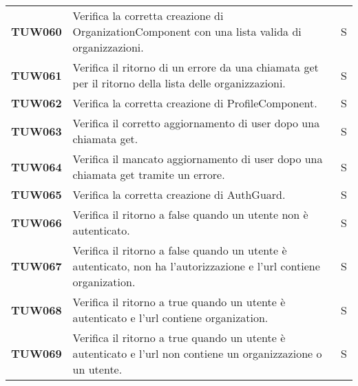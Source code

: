 \documentclass[../../piano-di-qualifica.tex]{subfiles}
\begin{document}
\begin{longtable}[H]{>{\centering\bfseries}m{3cm} >{}m{10cm} >{\centering\arraybackslash}m{3cm}}
  TUW060             & Verifica la corretta creazione di OrganizationComponent con una lista valida di organizzazioni.                     & S                             \\

  TUW061             & Verifica il ritorno di un errore da una chiamata get per il ritorno della lista delle organizzazioni.               & S                             \\



  TUW062             & Verifica la corretta creazione di ProfileComponent.                                                                 & S                             \\

  TUW063             & Verifica il corretto aggiornamento di user dopo una chiamata get.                                                   & S                             \\

  TUW064             & Verifica il mancato aggiornamento di user dopo una chiamata get tramite un errore.                                  & S                             \\


  TUW065             & Verifica la corretta creazione di AuthGuard.                                                                        & S                             \\

  TUW066             & Verifica il ritorno a false quando un utente non è autenticato.                                                     & S                             \\

  TUW067             & Verifica il ritorno a false quando un utente è autenticato, non ha l'autorizzazione e l'url contiene organization.  & S                             \\

  TUW068             & Verifica il ritorno a true quando un utente è autenticato e l'url contiene organization.                            & S                             \\

  TUW069             & Verifica il ritorno a true quando un utente è autenticato e l'url non contiene un organizzazione o un utente.       & S                             \\


\end{longtable}
\end{document}
